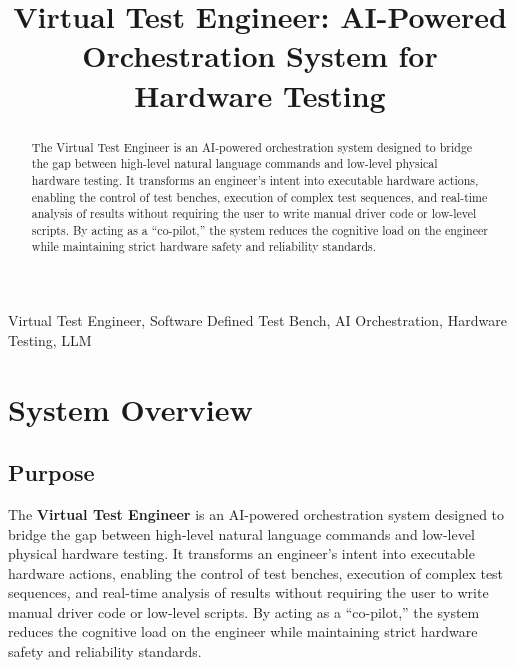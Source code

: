 \documentclass[conference]{IEEEtran}
\begin{document}
\title{Virtual Test Engineer: AI-Powered Orchestration System for Hardware Testing}

\author{
}

\maketitle

\begin{abstract}
The Virtual Test Engineer is an AI-powered orchestration system designed to bridge the gap between high-level natural language commands and low-level physical hardware testing. It transforms an engineer's intent into executable hardware actions, enabling the control of test benches, execution of complex test sequences, and real-time analysis of results without requiring the user to write manual driver code or low-level scripts. By acting as a ``co-pilot,'' the system reduces the cognitive load on the engineer while maintaining strict hardware safety and reliability standards.
\end{abstract}

\begin{IEEEkeywords}
Virtual Test Engineer, Software Defined Test Bench, AI Orchestration, Hardware Testing, LLM
\end{IEEEkeywords}

\section{System Overview}

\subsection{Purpose}
The \textbf{Virtual Test Engineer} is an AI-powered orchestration system designed to bridge the gap between high-level natural language commands and low-level physical hardware testing. It transforms an engineer's intent into executable hardware actions, enabling the control of test benches, execution of complex test sequences, and real-time analysis of results without requiring the user to write manual driver code or low-level scripts. By acting as a ``co-pilot,'' the system reduces the cognitive load on the engineer while maintaining strict hardware safety and reliability standards.
\end{document}
